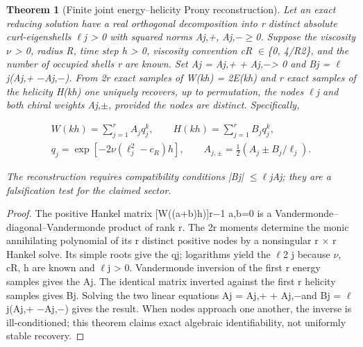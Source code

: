 \documentclass[10pt,letterpaper]{article}
\newtheorem{theorem}{Theorem}[section]
\theoremstyle{remark}
\begin{document}
\begin{theorem}[Finite joint energy–helicity Prony reconstruction]

Let an exact reducing solution have a real orthogonal decomposition into r distinct absolute curl-eigenshells \(\ell \)j > 0 with squared norms Aj,+, Aj,\(- \ge \)0. Suppose the viscosity \(\nu \) > 0, radius R, time step h > 0, viscosity convention cR \(\in \)\{0, 4/R2\}, and the number of occupied shells r are known. Set Aj = Aj,+ + Aj,\(- \)> 0 and Bj = \(\ell \)j(Aj,+ \(- \)Aj,\(- \)). From 2r exact samples of W(kh) = 2E(kh) and r exact samples of the helicity H(kh) one uniquely recovers, up to permutation, the nodes \(\ell \)j and both chiral weights Aj,\(\pm \), provided the nodes are distinct. Specifically,


\begin{equation}
\tag{105}\label{eq:105}
\begin{gathered}W(kh)=\sum_{j=1}^r A_jq_j^k,\qquad H(kh)=\sum_{j=1}^rB_jq_j^k,\\q_j=\exp[-2\nu(\ell_j^2-c_R)h],\qquad A_{j,\pm}=\tfrac12(A_j\pm B_j/\ell_j).\end{gathered}
\end{equation}

The reconstruction requires compatibility conditions |Bj| \(\le \ell \)jAj; they are a falsification test for the claimed sector.


\end{theorem}

\begin{proof}
The positive Hankel matrix [W((a+b)h)]r\(- \)1 a,b=0 is a Vandermonde–diagonal–Vandermonde product of rank r. The 2r moments determine the monic annihilating polynomial of its r distinct positive nodes by a nonsingular r \(\times \) r Hankel solve. Its simple roots give the qj; logarithms yield the \(\ell \)2 j because \(\nu \), cR, h are known and \(\ell \)j > 0. Vandermonde inversion of the first r energy samples gives the Aj. The identical matrix inverted against the first r helicity samples gives Bj. Solving the two linear equations Aj = Aj,+ + Aj,\(- \)and Bj = \(\ell \)j(Aj,+ \(- \)Aj,\(- \)) gives the result. When nodes approach one another, the inverse is ill-conditioned; this theorem claims exact algebraic identifiability, not uniformly stable recovery.

\end{proof}
\end{document}
